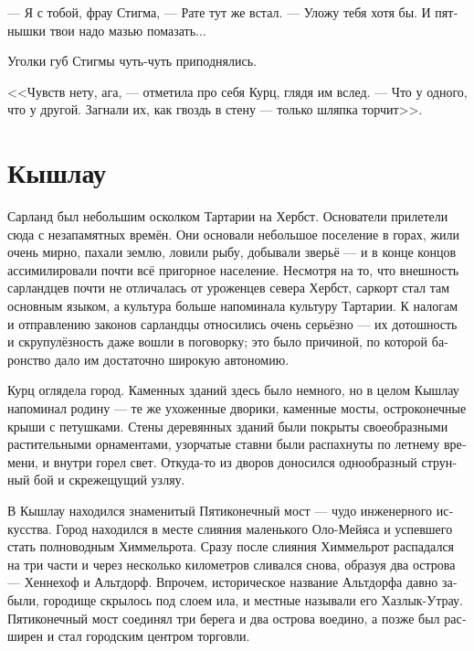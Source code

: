\documentclass[a4paper,12pt,fleqn]{book}\usepackage{polyglossia}\setdefaultlanguage[babelshorthands=true]{russian}\setotherlanguage{english}\defaultfontfeatures{Ligatures=TeX,Mapping=tex-text}\usepackage{xcolor}\newcommand{\ml}[3]{#2}
\begin{document}
--- Я с тобой, фрау Стигма, --- Рате тут же встал.
--- Уложу тебя хотя бы.
И пятнышки твои надо мазью помазать...

Уголки губ Стигмы чуть-чуть приподнялись.

<<Чувств нету, ага, --- отметила про себя Курц, глядя им вслед.
--- Что у одного, что у другой.
Загнали их, как гвоздь в стену --- только шляпка торчит>>.

\section{Кышлау}

Сарланд был небольшим осколком Тартарии на Хербст.
Основатели прилетели сюда с незапамятных времён.
Они основали небольшое поселение в горах, жили очень мирно, пахали землю, ловили рыбу, добывали зверьё --- и в конце концов ассимилировали почти всё пригорное население.
Несмотря на то, что внешность сарландцев почти не отличалась от уроженцев севера Хербст, саркорт стал там основным языком, а культура больше напоминала культуру Тартарии.
К налогам и отправлению законов сарландцы относились очень серьёзно --- их дотошность и скрупулёзность даже вошли в поговорку;
это было причиной, по которой баронство дало им достаточно широкую автономию.

Курц оглядела город.
Каменных зданий здесь было немного, но в целом Кышлау напоминал родину --- те же ухоженные дворики, каменные мосты, остроконечные крыши с петушками.
Стены деревянных зданий были покрыты своеобразными растительными орнаментами, узорчатые ставни были распахнуты по летнему времени, и внутри горел свет.
Откуда-то из дворов доносился однообразный струнный бой и скрежещущий узляу.

\ml{$0$}
{В Кышлау находился знаменитый Пятиконечный мост --- чудо инженерного искусства.}
{Qyschlau housed the famous Five-pointed Bridge, an engineering marvel.}
\ml{$0$}
{Город находился в месте слияния маленького Оло-Мейяса и успевшего стать полноводным Химмельрота.}
{The town was located at the confluence of little Olo-Mej\o{}s and already flooding Himmelrot.}
Сразу после слияния Химмельрот распадался на три части и через несколько километров сливался снова, образуя два острова --- Хеннехоф и Альтдорф.
\ml{$0$}
{Впрочем, историческое название Альтдорфа давно забыли, городище скрылось под слоем ила, и местные называли его Хазлык-Утрау.}
{However, the historical name of Altdorf was forgotten long ago, the burg was hidden under sludge, and locals called the island Ha\dh{}lyq-Utrau.}
Пятиконечный мост соединял три берега и два острова воедино, а позже был расширен и стал городским центром торговли.
\end{document}
